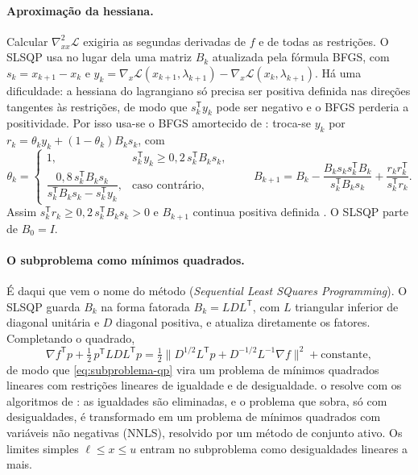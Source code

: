 \documentclass[12pt, oneside, a4paper, english, brazil]{abntex2}
\theoremstyle{relatorio}
\theoremstyle{relatorioit}
\theoremstyle{problema}
\begin{document}
\paragraph{Aproximação da hessiana.} Calcular $\nabla^2_{xx}\mathcal{L}$ exigiria as
segundas derivadas de $f$ e de todas as restrições. O SLSQP usa no lugar dela uma
matriz $B_k$ atualizada pela fórmula BFGS, com
$s_k = x_{k+1} - x_k$ e $y_k = \nabla_x\mathcal{L}(x_{k+1}, \lambda_{k+1}) -
\nabla_x\mathcal{L}(x_k, \lambda_{k+1})$. Há uma dificuldade: a hessiana do lagrangiano
só precisa ser positiva definida nas direções tangentes às restrições, de modo que
$s_k^{\mathsf T}y_k$ pode ser negativo e o BFGS perderia a positividade. Por isso usa-se
o BFGS amortecido de \textcite{powell1978}: troca-se $y_k$ por
$r_k = \theta_k y_k + (1 - \theta_k) B_k s_k$, com
\begin{equation}
  \theta_k = \begin{cases}
    1, & s_k^{\mathsf T}y_k \ge 0{,}2\, s_k^{\mathsf T}B_k s_k, \\[2pt]
    \dfrac{0{,}8\, s_k^{\mathsf T}B_k s_k}{s_k^{\mathsf T}B_k s_k - s_k^{\mathsf T}y_k}, & \text{caso contrário},
  \end{cases}
  \qquad
  B_{k+1} = B_k - \frac{B_k s_k s_k^{\mathsf T} B_k}{s_k^{\mathsf T}B_k s_k} + \frac{r_k r_k^{\mathsf T}}{s_k^{\mathsf T} r_k}.
  \label{eq:bfgs-amortecido}
\end{equation}
Assim $s_k^{\mathsf T}r_k \ge 0{,}2\, s_k^{\mathsf T}B_k s_k > 0$ e $B_{k+1}$ continua
positiva definida \parencite[proc.~18.2]{nocedal2006}. O SLSQP parte de $B_0 = I$.

\paragraph{O subproblema como mínimos quadrados.} É daqui que vem o nome do método
(\emph{Sequential Least SQuares Programming}). O SLSQP guarda $B_k$ na forma fatorada
$B_k = L D L^{\mathsf T}$, com $L$ triangular inferior de diagonal unitária e $D$
diagonal positiva, e atualiza diretamente os fatores. Completando o quadrado,
\begin{equation}
  \nabla f^{\mathsf T} p + \tfrac12\, p^{\mathsf T} L D L^{\mathsf T} p
  = \tfrac12 \bigl\| D^{1/2} L^{\mathsf T} p + D^{-1/2} L^{-1} \nabla f \bigr\|^2 + \text{constante},
\end{equation}
de modo que \eqref{eq:subproblema-qp} vira um problema de mínimos quadrados lineares
com restrições lineares de igualdade e de desigualdade. \textcite{kraft1988} o resolve
com os algoritmos de \textcite{lawson1974}: as igualdades são eliminadas, e o problema
que sobra, só com desigualdades, é transformado em um problema de mínimos quadrados
com variáveis não negativas (NNLS), resolvido por um método de conjunto ativo. Os
limites simples $\ell \le x \le u$ entram no subproblema como desigualdades lineares a
mais.
\end{document}

